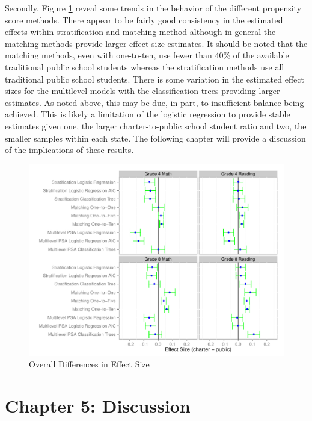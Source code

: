 \documentclass[letterpaper,12p,twoside]{article} %
\begin{document}
Secondly, Figure \ref{fig:overalldiff} reveal some trends in the behavior of the different propensity score methods. There appear to be fairly good consistency in the estimated effects within stratification and matching method although in general the matching methods provide larger effect size estimates. It should be noted that the matching methods, even with one-to-ten, use fewer than 40\% of the available traditional public school students whereas the stratification methods use all traditional public school students. There is some variation in the estimated effect sizes for the multilevel models with the classification trees providing larger estimates. As noted above, this may be due, in part, to insufficient balance being achieved. This is likely a limitation of the logistic regression to provide stable estimates given one, the larger charter-to-public school student ratio and two, the smaller samples within each state. The following chapter will provide a discussion of the implications of these results.

\begin{figure}[t]
\begin{center}
\includegraphics[width=\textwidth]{../Figures2009/Overall.pdf}
\caption{Overall Differences in Effect Size}
\label{fig:overalldiff}
\end{center}
\end{figure}





\cleardoublepage
\section{Chapter 5: Discussion}
\end{document}
